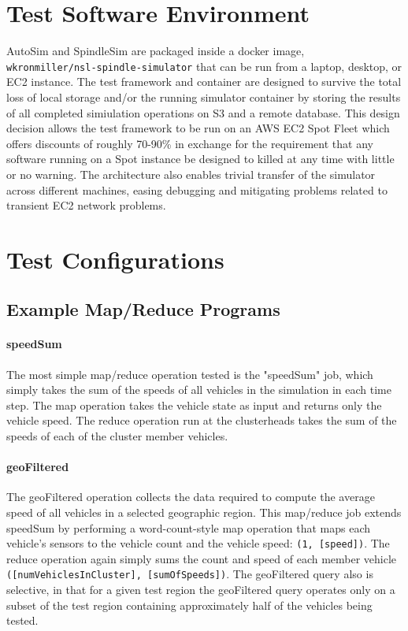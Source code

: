 \documentclass{thesis}
\begin{document}
\section{Test Software Environment}
    AutoSim and SpindleSim are packaged inside a docker image, \\\verb|wkronmiller/nsl-spindle-simulator| that can be run from
    a laptop, desktop, or EC2 instance. The test framework and container are designed to survive the total loss of local
    storage and/or the running simulator container by storing the results of all completed simiulation operations on
    S3 and a remote database. This design decision allows the test framework to be run on an AWS EC2 Spot Fleet %
    which offers discounts of roughly 70-90\% in exchange for the requirement that any software running on a Spot instance
    be designed to killed at any time with little or no warning. %
    The architecture also enables trivial transfer of the simulator across different machines, easing debugging and mitigating
    problems related to transient EC2 network problems. 

\section{Test Configurations}
\subsection{Example Map/Reduce Programs}
    \paragraph{speedSum}
        The most simple map/reduce operation tested is the "speedSum" job, which simply takes the sum of the speeds of all
        vehicles in the simulation in each time step. The map operation takes the vehicle state as input and returns only
        the vehicle speed. The reduce operation run at the clusterheads takes the sum of the speeds
        of each of the cluster member vehicles.
    \paragraph{geoFiltered}
        The geoFiltered operation collects the data required to compute the average speed of all vehicles in a selected
        geographic region. This map/reduce job extends speedSum by performing a word-count-style map operation that maps each vehicle's sensors
        to the vehicle count and the vehicle speed: \verb|(1, [speed])|. The reduce operation again simply sums the count
        and speed of each member vehicle \verb|([numVehiclesInCluster], [sumOfSpeeds])|. The geoFiltered query also is selective,
        in that for a given test region the geoFiltered query operates only on a subset of the test region containing approximately
        half of the vehicles being tested.
\end{document}
